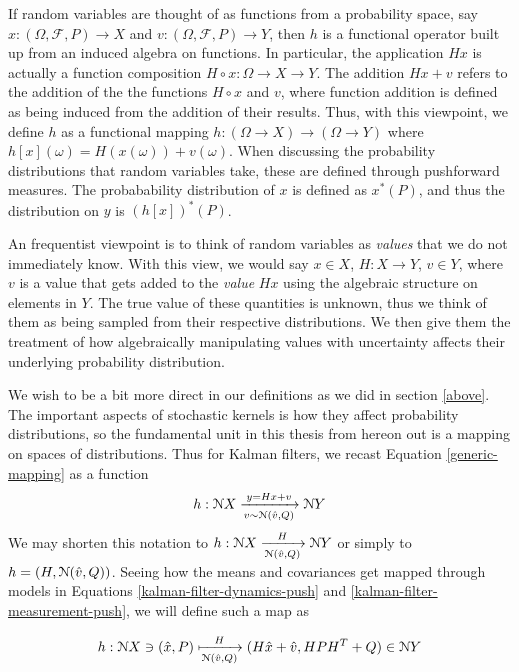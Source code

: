 If random variables are thought of as functions from a probability space, say $x:(\Omega,\mathcal{F}, P)\rightarrow X$ and $v:(\Omega,\mathcal{F}, P)\rightarrow Y$, then $h$ is a functional operator built up from an induced algebra on functions. In particular, the application $Hx$ is actually a function composition $H\circ x : \Omega \rightarrow X \rightarrow Y$. The addition $Hx + v$ refers to the addition of the the functions $H\circ x$ and $v$, where function addition is defined as being induced from the addition of their results. Thus, with this viewpoint, we define $h$ as a functional mapping $h:(\Omega\rightarrow X) \rightarrow (\Omega\rightarrow Y)$ where $h[x](\omega) = H(x(\omega)) + v(\omega)$. When discussing the probability distributions that random variables take, these are defined through pushforward measures. The probabability distribution of $x$ is defined as $x^*(P)$, and thus the distribution on $y$ is $(h[x])^*(P)$.

An frequentist viewpoint is to think of random variables as \emph{values} that we do not immediately know. With this view, we would say $x\in X$, $H:X\rightarrow Y$, $v\in Y$, where $v$ is a value that gets added to the \emph{value} $Hx$ using the algebraic structure on elements in $Y$. The true value of these quantities is unknown, thus we think of them as being sampled from their respective distributions. We then give them the treatment of how algebraically manipulating values with uncertainty affects their underlying probability distribution.

We wish to be a bit more direct in our definitions as we did in section \ref{above}. The important aspects of stochastic kernels is how they affect probability distributions, so the fundamental unit in this thesis from hereon out is a mapping on spaces of distributions. Thus for Kalman filters, we recast Equation \ref{generic-mapping} as a function
\begin{equation}
	h:\mathcal{N} X\xrightarrow[v\sim\mathcal{N}(\hat{v},Q)]{y = Hx + v} \mathcal{N} Y
\end{equation}
We may shorten this notation to $h:\mathcal{N} X \xrightarrow[\mathcal{N}(\hat{v},Q)]{H} \mathcal{N} Y$ or simply to $h = (H, \mathcal{N}(\hat{v},Q))$.
Seeing how the means and covariances get mapped through models in Equations \ref{kalman-filter-dynamics-push} and \ref{kalman-filter-measurement-push}, we will define such a map as

\begin{equation}
	\label{gaussian-map}
	h:\mathcal{N} X\ni (\hat{x},P) \xmapsto[\mathcal{N}(\hat{v}, Q)]{H} (H\hat{x} + \hat{v}, HPH^T + Q) \in \mathcal{N} Y
\end{equation}

